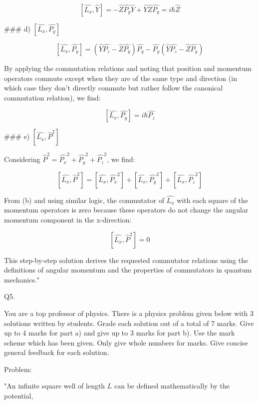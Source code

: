 \[
\left[ \hat{L_{x}}, \hat{Y} \right] = -\hat{Z}\hat{P_{y}}\hat{Y} + \hat{Y}\hat{Z}\hat{P_{y}} = i\hbar\hat{Z}
\]

### d) \( \left[ \hat{L_{x}}, \hat{P_{y}} \right] \)

\[
\left[ \hat{L_{x}}, \hat{P_{y}} \right] = (\hat{Y}\hat{P_{z}} - \hat{Z}\hat{P_{y}})\hat{P_{y}} - \hat{P_{y}}(\hat{Y}\hat{P_{z}} - \hat{Z}\hat{P_{y}})
\]

By applying the commutation relations and noting that position and momentum operators commute except when they are of the same type and direction (in which case they don't directly commute but rather follow the canonical commutation relation), we find:

\[
\left[ \hat{L_{x}}, \hat{P_{y}} \right] = i\hbar\hat{P_{z}}
\]

### e) \( \left[ \hat{L_{x}}, \hat{P}^{2} \right] \)

Considering \( \hat{P}^{2} = \hat{P_{x}}^2 + \hat{P_{y}}^2 + \hat{P_{z}}^2 \), we find:

\[
\left[ \hat{L_{x}}, \hat{P}^{2} \right] = \left[ \hat{L_{x}}, \hat{P_{x}}^2 \right] + \left[ \hat{L_{x}}, \hat{P_{y}}^2 \right] + \left[ \hat{L_{x}}, \hat{P_{z}}^2 \right]
\]

From (b) and using similar logic, the commutator of \( \hat{L_{x}} \) with each square of the momentum operators is zero because these operators do not change the angular momentum component in the x-direction:

\[
\left[ \hat{L_{x}}, \hat{P}^{2} \right] = 0
\]

This step-by-step solution derives the requested commutator relations using the definitions of angular momentum and the properties of commutators in quantum mechanics."



                           Q5. 

You are a top professor of physics. There is a physics problem given below with 3 solutions written by students. Grade each solution out of a total of 7 marks. Give up to 4 marks for part a) and give up to 3 marks for part b). Use the mark scheme which has been given. Only give whole numbers for marks. Give concise general feedback for each solution. 

Problem:

"An infinite square well of length \( L \) can be defined mathematically by the potential,

